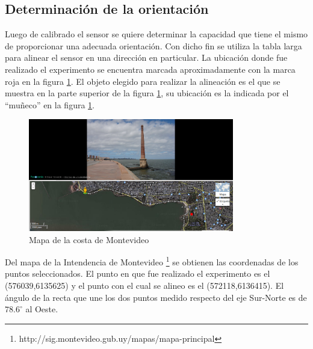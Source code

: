 \documentclass[main]{subfiles}
\begin{document}
\subsection{Determinaci\'on de la orientaci\'on}


Luego de calibrado el sensor se quiere determinar la capacidad que tiene el mismo de proporcionar una adecuada orientación. Con dicho fin se utiliza la tabla larga para alinear el sensor en una dirección en particular. La ubicación donde fue realizado el experimento se encuentra marcada aproximadamente con la marca roja en la figura \ref{fig:mapa}. El objeto elegido para realizar la alineación es el que se muestra en la parte superior de la figura \ref{fig:mapa}, su ubicación es la indicada por el ``mu\~neco'' en la figura \ref{fig:mapa}.
\begin{figure}
  \begin{center}
	\includegraphics[width=0.8\textwidth]
		{./pics_magneto/mapa.png}
	
  \end{center}
  \caption{Mapa de la costa de Montevideo}
  \label{fig:mapa}
\end{figure}

Del mapa de la Intendencia de Montevideo \footnote{http://sig.montevideo.gub.uy/mapas/mapa-principal} se obtienen las coordenadas de los puntos seleccionados. El punto en que fue realizado el experimento es el (576039,6135625) y el punto con el cual se alineo es el (572118,6136415). El ángulo de la recta que une los dos puntos medido respecto del eje Sur-Norte es de $78.6^\circ$ al Oeste.\\
\end{document}
